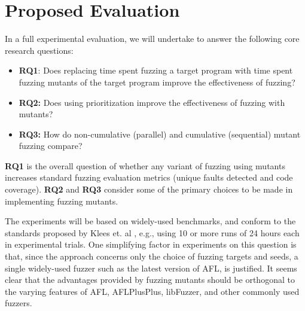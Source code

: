 \section{Proposed Evaluation}

In a full experimental evaluation, we will undertake to answer the following core research questions:

\begin{itemize}
  \item {\bf RQ1}: Does replacing time spent fuzzing a target program with time spent fuzzing mutants of the target program improve
  the effectiveness of fuzzing?
  \item {\bf RQ2:} Does using prioritization improve the effectiveness of fuzzing with mutants?
  \item {\bf RQ3:} How do non-cumulative (parallel) and cumulative (sequential) mutant fuzzing compare?
  \end{itemize}
  
{\bf RQ1} is the overall question of whether any variant of fuzzing using mutants increases standard fuzzing evaluation metrics
(unique faults detected and code coverage).  {\bf RQ2} and {\bf RQ3} consider some of the primary choices to be made in implementing fuzzing mutants.

The experiments will be based on widely-used benchmarks, and conform to the standards proposed by Klees et. al \cite{evalfuzz}, e.g., using 10 or
more runs of 24 hours each in experimental trials.  One simplifying factor in experiments on this question is that, since the approach concerns
only the choice of fuzzing targets and seeds, a single widely-used fuzzer such as the latest version of AFL, is justified.  It seems clear that
the advantages provided by fuzzing mutants should be orthogonal to the varying features of AFL, AFLPlusPlus, libFuzzer, and other commonly
used fuzzers.
